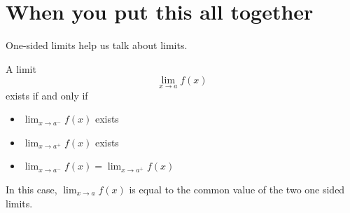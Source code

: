 \documentclass{ximera}
\begin{document}
\section{When you put this all together}

One-sided limits help us talk about limits.
\begin{theorem}
  A limit
  \[
  \lim_{x \to a} f(x)
  \]
  exists if and only if
  \begin{itemize}
  \item $\lim_{x \to a^-} f(x)$ exists
  \item $\lim_{x \to a^+} f(x)$ exists
  \item $\lim_{x \to a^-} f(x) = \lim_{x \to a^+} f(x)$
  \end{itemize}
  In this case, $\lim_{x \to a} f(x)$ is equal to the common
  value of the two one sided limits.
\end{theorem}
\end{document}

